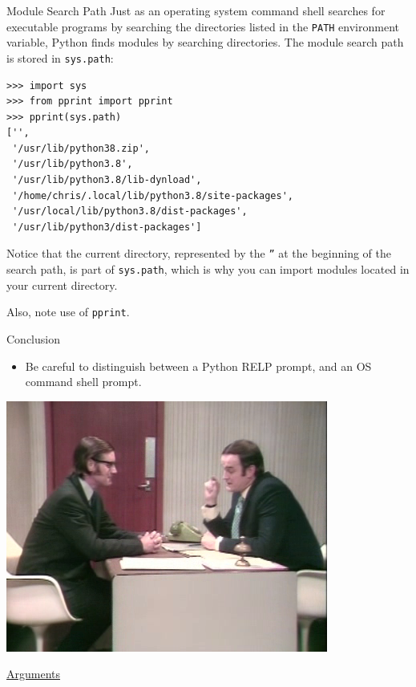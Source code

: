 \documentclass[smaller, aspectratio=1610]{beamer}
\begin{document}
\begin{frame}[label={sec:org509296d},fragile]{Module Search Path}
 Just as an operating system command shell searches for executable programs by searching the directories listed in the \texttt{PATH} environment variable, Python finds modules by searching directories. The module search path is stored in \texttt{sys.path}:

\lstset{language=Python,label= ,caption= ,captionpos=b,numbers=none}
\begin{lstlisting}
>>> import sys
>>> from pprint import pprint
>>> pprint(sys.path)
['',
 '/usr/lib/python38.zip',
 '/usr/lib/python3.8',
 '/usr/lib/python3.8/lib-dynload',
 '/home/chris/.local/lib/python3.8/site-packages',
 '/usr/local/lib/python3.8/dist-packages',
 '/usr/lib/python3/dist-packages']
\end{lstlisting}

Notice that the current directory, represented by the \texttt{''} at the beginning of the search path, is part of \texttt{sys.path}, which is why you can import modules located in your current directory.

Also, note use of \texttt{pprint}.
\end{frame}

\begin{frame}[label={sec:orgf2822db}]{Conclusion}
\begin{itemize}
\item Be careful to distinguish between a Python RELP prompt, and an OS command shell prompt.
\end{itemize}

\begin{center}
\includegraphics[height=.4\textheight]{./Argument_Clinic.png}
\end{center}


\href{https://www.youtube.com/watch?v=DkQhK8O9Jik}{Arguments}
\end{frame}
\end{document}
